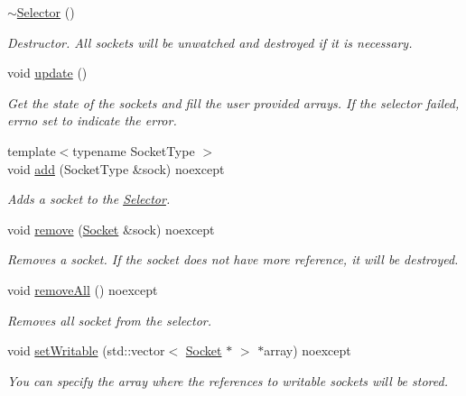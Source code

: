 \begin{DoxyCompactItemize}
\hyperlink{classtnnf_1_1_selector_a6042ab1f47fabf155e3d553f5915cb20}{$\sim$\+Selector} ()
\begin{DoxyCompactList}\small\item\em Destructor. All sockets will be unwatched and destroyed if it is necessary. \end{DoxyCompactList}\item 
void \hyperlink{classtnnf_1_1_selector_a56fd12ff21981124269b5bd5088af35e}{update} ()
\begin{DoxyCompactList}\small\item\em Get the state of the sockets and fill the user provided arrays. If the selector failed, errno set to indicate the error. \end{DoxyCompactList}\item 
{\footnotesize template$<$typename Socket\+Type $>$ }\\void \hyperlink{classtnnf_1_1_selector_a439ee1a5d523971b0e534d33e3949fcb}{add} (Socket\+Type \&sock) noexcept
\begin{DoxyCompactList}\small\item\em Adds a socket to the \hyperlink{classtnnf_1_1_selector}{Selector}. \end{DoxyCompactList}\item 
void \hyperlink{classtnnf_1_1_selector_a72c6a0be81609137a5642651fd2e2538}{remove} (\hyperlink{classtnnf_1_1_socket}{Socket} \&sock) noexcept
\begin{DoxyCompactList}\small\item\em Removes a socket. If the socket does not have more reference, it will be destroyed. \end{DoxyCompactList}\item 
void \hyperlink{classtnnf_1_1_selector_a28f6afe65d89053cd3975210885f7650}{remove\+All} () noexcept
\begin{DoxyCompactList}\small\item\em Removes all socket from the selector. \end{DoxyCompactList}\item 
void \hyperlink{classtnnf_1_1_selector_a93a5ec8731ffc17f5f82c76471479f51}{set\+Writable} (std\+::vector$<$ \hyperlink{classtnnf_1_1_socket}{Socket} $\ast$ $>$ $\ast$array) noexcept
\begin{DoxyCompactList}\small\item\em You can specify the array where the references to writable sockets will be stored. \end{DoxyCompactList}\item 

\end{DoxyCompactItemize}
